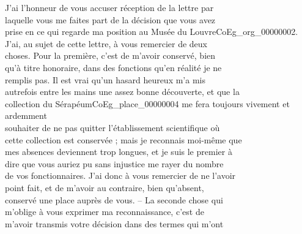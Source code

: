 \documentclass{book}
\begin{document}
\indent J’ai l’honneur de vous accuser réception de la lettre par\\
laquelle vous me faites part de la décision que vous avez\\
prise en ce qui regarde ma position au Musée du Louvre\gls{CoEg_org_00000002}.\\
\indent J’ai, au sujet de cette lettre, à vous remercier de deux\\
choses. Pour la première, c’est de m’avoir conservé, bien\\
qu’à titre honoraire, dans des fonctions qu’en réalité je ne\\
remplis pas. Il est vrai qu’un hasard heureux m’a mis\\
autrefois entre les mains une assez bonne découverte, et que la\\
collection du Sérapéum\gls{CoEg_place_00000004} me fera toujours vivement et ardemment\\
souhaiter de ne pas quitter l’établissement scientifique où\\
cette collection est conservée ; mais je reconnais moi-même que\\
mes absences deviennent trop longues, et je suis le premier à\\
dire que vous auriez pu sans injustice me rayer du nombre\\
de vos fonctionnaires. J’ai donc à vous remercier de ne l’avoir\\
point fait, et de m’avoir au contraire, bien qu’absent,\\
conservé une place auprès de vous. – La seconde chose qui\\
m’oblige à vous exprimer ma reconnaissance, c’est de\\
m’avoir transmis votre décision dans des termes qui m’ont\\
\end{document}
